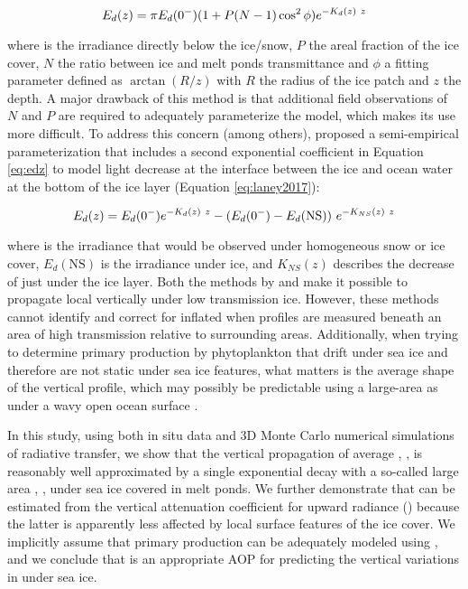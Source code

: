 \begin{equation}
    {E_d(z)}{} = \pi {E_d(0^-)}{} (1 + P(N-1)\cos^2\phi)e^{-K_{d}(z)~z}
    \label{eq:frey2011}
\end{equation}

\noindent where \edzero{} is the irradiance directly below the ice/snow, $P$ the areal fraction of the ice cover, $N$ the ratio between ice and melt ponds transmittance and $\phi$ a fitting parameter defined as $\arctan(R/z)$ with $R$ the radius of the ice patch and $z$ the depth. A major drawback of this method is that additional field observations of $N$ and $P$ are required to adequately parameterize the model, which makes its use more difficult. To address this concern (among others), \citet{Laney2017} proposed a semi-empirical parameterization that includes a second exponential coefficient in Equation \ref{eq:edz} to model light decrease at the interface between the ice and ocean water at the bottom of the ice layer (Equation \ref{eq:laney2017}):

\begin{equation}
    {E_d(z)}{} = {E_d(0^-)}{}e^{-K_{d}(z)~z} - ({E_d(0^-)}{} - E_d(\text{NS}))~e^{-K_{NS}(z)~z}
    \label{eq:laney2017}
\end{equation}

\noindent where \edzero{} is the irradiance that would be observed under homogeneous snow or ice cover, $E_d(\text{NS})$ is the irradiance under ice, and $K_{NS}(z)$ describes the decrease of \edzero{} just under the ice layer. Both the methods by \citet{Frey2011} and \citet{Laney2017} make it possible to propagate local \edz{} vertically under low transmission ice. However, these methods cannot identify and correct for inflated \ked{} when profiles are measured beneath an area of high transmission relative to surrounding areas. Additionally, when trying to determine primary production by phytoplankton that drift under sea ice and therefore are not static under sea ice features, what matters is the average shape of the vertical \edz{} profile, which may possibly be predictable using a large-area \meanked{} as under a wavy open ocean surface \citep{Zaneveld2001}. 

In this study, using both in situ data and 3D Monte Carlo numerical simulations of radiative transfer, we show that the vertical propagation of average \edz{}, \meanedz{}, is reasonably well approximated by a single exponential decay with a so-called large area \ked{}, \meanked{}, under sea ice covered in melt ponds. We further demonstrate that \meanked{} can be estimated from the vertical attenuation coefficient for upward radiance (\klu{}) because the latter is apparently less affected by local surface features of the ice cover. We implicitly assume that primary production can be adequately modeled using \meanedz{}, and we conclude that \klu{} is an appropriate AOP for predicting the vertical variations in \meanedz{} under sea ice.